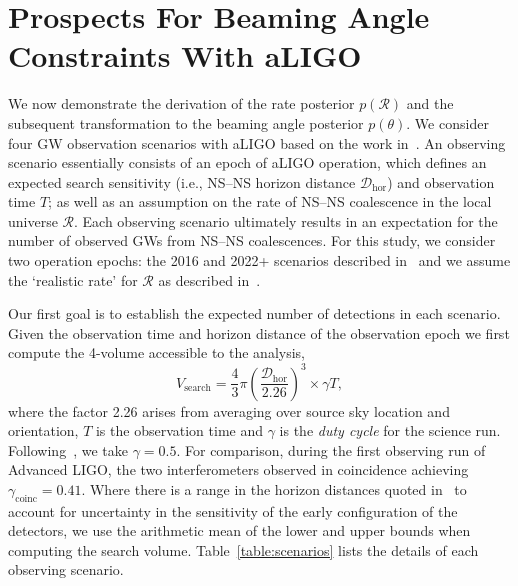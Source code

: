 \documentclass[twocolumn,nofootinbib]{revtex4-1}
\newcommand{\cbcrate}{{{\mathcal R}}}
\newcommand{\dhor}{{\mathcal D}_{\mathrm{hor}}}
\newcommand{\BNS}{\ac{NS}--\ac{NS}\xspace}
\begin{document}
\section{Prospects For Beaming Angle Constraints With aLIGO}
We now demonstrate the derivation of the rate posterior $p(\cbcrate)$ and the subsequent transformation to the beaming angle posterior $p(\theta)$.
We consider four \ac{GW} observation scenarios with aLIGO based on the work in~\cite{ade_prospects}.
An observing scenario essentially consists of an epoch of aLIGO operation, which defines an expected search sensitivity (i.e., \BNS horizon distance $\dhor$) and observation time $T$; as well as an assumption on the rate of \BNS coalescence in the local universe $\cbcrate$.
Each observing scenario ultimately results in an expectation for the number of observed \acp{GW} from \BNS coalescences.
For this study, we consider two operation epochs: the 2016 and 2022+ scenarios described in~\cite{ade_prospects} and we assume the `realistic rate' for $\cbcrate$ as described in~\cite{rates_paper}.

Our first goal is to establish the expected number of detections in each scenario.
Given the observation time and horizon distance of the observation epoch we first compute the 4-volume accessible to the analysis,
%
\begin{equation}
    \label{eq:search_volume}
    V_{\mathrm{search}} = \frac{4}{3}\pi \left(\frac{\dhor}{2.26}\right)^3 \times \gamma T,
\end{equation}
%
where the factor 2.26 arises from averaging over source sky location and orientation, $T$ is the observation time and $\gamma$ is the \emph{duty cycle} for the science run.
Following~\cite{ade_prospects}, we take $\gamma=0.5$.
For comparison, during the first observing run of Advanced LIGO, the two interferometers observed in coincidence achieving $\gamma_{\mathrm{coinc}} = 0.41$.
Where there is a range in the horizon distances quoted in~\cite{ade_prospects} to account for uncertainty in the sensitivity of the early configuration of the detectors, we use the arithmetic mean of the lower and upper bounds when computing the search volume.
Table~\ref{table:scenarios} lists the details of each observing scenario.
\end{document}

